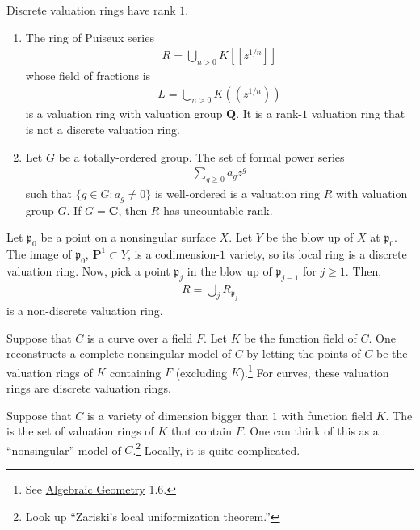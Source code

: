\documentclass [11 pt, oneside] {article}
\begin{document}
\begin{remark}
	Discrete valuation rings have rank $1$.
\end{remark}

\begin{example}\label{}\text{}
\begin{enumerate}
	\item The ring of Puiseux series
		\begin{align*}
			R = \bigcup_{n>0} K[\![z^{1/n}]\!]
		\end{align*}
		whose field of fractions is
		\begin{align*}
			L = \bigcup_{n>0} K(\!(z^{1/n})\!)
		\end{align*}
		is a valuation ring with valuation group $\mathbf{Q}$. It is a rank-$1$ valuation ring that is not a discrete valuation ring. 
	\item Let $G$ be a totally-ordered group. The set of formal power series
		\begin{align*}
			\sum_{g\ge 0}^{} a_gz^g
		\end{align*}
		such that $\{g\in G: a_g\ne 0\}$ is well-ordered is a valuation ring $R$ with valuation group $G$. If $G=\mathbf{C}$, then $R$ has uncountable rank.
\end{enumerate}
\end{example}

Let $\mathfrak{p}_0$ be a point on a nonsingular surface $X$. Let $Y$ be the blow up of $X$ at $\mathfrak{p}_0$. The image of $\mathfrak{p}_0$, $\mathbf{P}^1\subset Y$, is a codimension-$1$ variety, so its local ring is a discrete valuation ring. Now, pick a point $\mathfrak{p}_j$ in the blow up of $\mathfrak{p}_{j-1}$ for $j\ge 1$. Then,
\begin{align*}
	R = \bigcup_j R_{\mathfrak{p}_j}
\end{align*}
is a non-discrete valuation ring.

Suppose that $C$ is a curve over a field $F$. Let $K$ be the function field of $C$. One reconstructs a complete nonsingular model of $C$ by letting the points of $C$ be the valuation rings of $K$ containing $F$ (excluding $K$).\footnote{See \ul{Algebraic Geometry} 1.6.} For curves, these valuation rings are discrete valuation rings.

Suppose that $C$ is a variety of dimension bigger than $1$ with function field $K$. The  is the set of valuation rings of $K$ that contain $F$. One can think of this as a ``nonsingular'' model of $C$.\footnote{Look up ``Zariski's local uniformization theorem.''} Locally, it is quite complicated.
\end{document}
